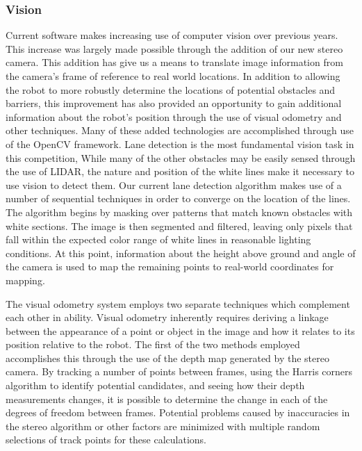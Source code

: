 \subsubsection{Vision}
Current software makes increasing use of computer vision over previous years. This increase was largely made possible through the addition of our new stereo camera. This addition has give us a means to translate image information from the camera's frame of reference to real world locations. In addition to allowing the robot to more robustly determine the locations of potential obstacles and barriers, this improvement has also provided an opportunity to gain additional information about the robot's position through the use of visual odometry and other techniques. Many of these added technologies are accomplished through use of the OpenCV framework.
Lane detection is the most fundamental vision task in this competition, While many of the other obstacles may be easily sensed through the use of LIDAR, the nature and position of the white lines make it necessary to use vision to detect them. Our current lane detection algorithm makes use of a number of sequential techniques in order to converge on the location of the lines. The algorithm begins by masking over patterns that match known obstacles with white sections. The image is then segmented and filtered, leaving only pixels that fall within the expected color range of white lines in reasonable lighting conditions. At this point, information about the height above ground and angle of the camera is used to map the remaining points to real-world coordinates for mapping.

The visual odometry system employs two separate techniques which complement each other in ability. Visual odometry inherently requires deriving a linkage between the appearance of a point or object in the image and how it relates to its position relative to the robot. The first of the two methods employed accomplishes this through the use of the depth map generated by the stereo camera. By tracking a number of points between frames, using the Harris corners algorithm to identify potential candidates, and seeing how their depth measurements changes, it is possible to determine the change in each of the degrees of freedom between frames. Potential problems caused by inaccuracies in the stereo algorithm or other factors are minimized with multiple random selections of track points for these calculations. 

